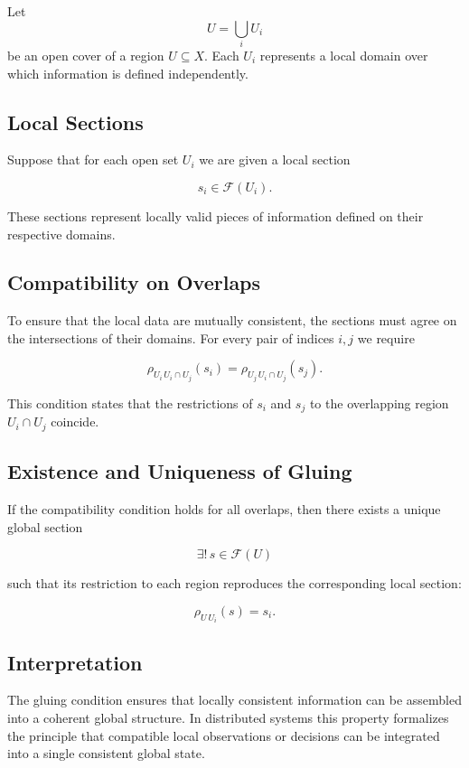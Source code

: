 \documentclass[12pt]{article}
\begin{document}
Let
\[
U = \bigcup_i U_i
\]
be an open cover of a region $U \subseteq X$. Each $U_i$ represents a local domain over which information is defined independently.

\subsection{Local Sections}

Suppose that for each open set $U_i$ we are given a local section

\[
s_i \in \mathcal{F}(U_i).
\]

These sections represent locally valid pieces of information defined on their respective domains.

\subsection{Compatibility on Overlaps}

To ensure that the local data are mutually consistent, the sections must agree on the intersections of their domains. For every pair of indices $i,j$ we require

\[
\rho_{U_i\, U_i \cap U_j}(s_i)
=
\rho_{U_j\, U_i \cap U_j}(s_j).
\]

This condition states that the restrictions of $s_i$ and $s_j$ to the overlapping region $U_i \cap U_j$ coincide.

\subsection{Existence and Uniqueness of Gluing}

If the compatibility condition holds for all overlaps, then there exists a unique global section

\[
\exists !\, s \in \mathcal{F}(U)
\]

such that its restriction to each region reproduces the corresponding local section:

\[
\rho_{U\,U_i}(s) = s_i.
\]

\subsection{Interpretation}

The gluing condition ensures that locally consistent information can be assembled into a coherent global structure. In distributed systems this property formalizes the principle that compatible local observations or decisions can be integrated into a single consistent global state.
\end{document}

